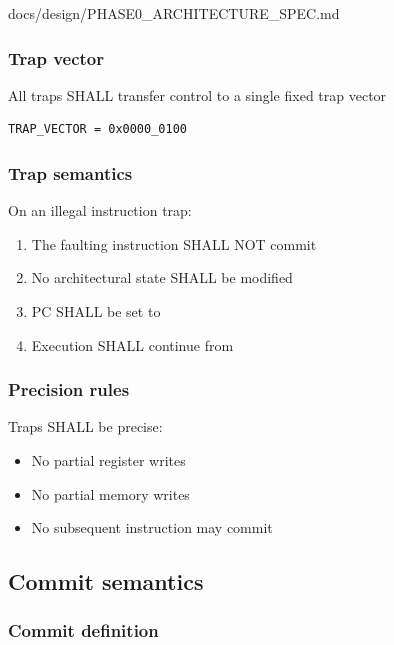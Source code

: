 \begin{relocated}{docs/design/PHASE0_ARCHITECTURE_SPEC.md}
\subsubsection{Trap vector}\label{ds:ch:phase0-architecture:trap-vector}

All traps SHALL transfer control to a single fixed trap vector

\begin{lstlisting}[language={}]
TRAP_VECTOR = 0x0000_0100
\end{lstlisting}

\subsubsection{Trap semantics}\label{ds:ch:phase0-architecture:trap-semantics}

On an illegal instruction trap:

\begin{enumerate}
\def\labelenumi{\arabic{enumi}.}
\tightlist
\item
  The faulting instruction SHALL NOT commit
\item
  No architectural state SHALL be modified
\item
  PC SHALL be set to 
\item
  Execution SHALL continue from 
\end{enumerate}

\subsubsection{Precision rules}\label{ds:ch:phase0-architecture:precision-rules}

Traps SHALL be precise:

\begin{itemize}
\tightlist
\item
  No partial register writes
\item
  No partial memory writes
\item
  No subsequent instruction may commit
\end{itemize}

\subsection{Commit semantics}\label{ds:ch:phase0-architecture:commit-semantics}

\subsubsection{Commit definition}\label{ds:ch:phase0-architecture:commit-definition}


\end{relocated}
